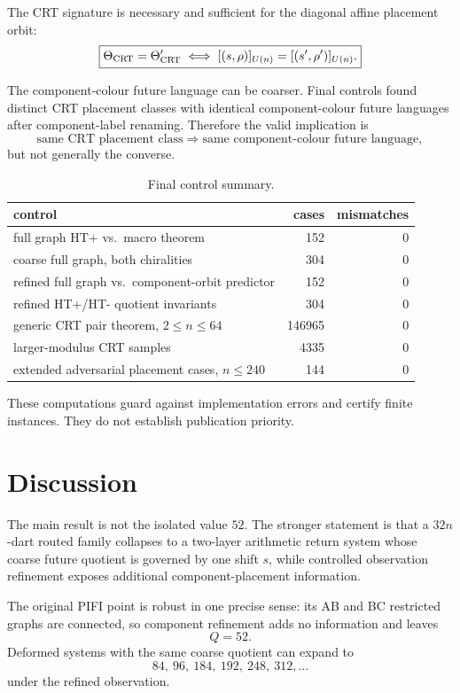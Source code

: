 \documentclass[11pt,a4paper]{article}
\theoremstyle{definition}
\begin{document}
The CRT signature is necessary and sufficient for the diagonal affine placement orbit:
\[
\boxed{
\Theta_{\rm CRT}=\Theta'_{\rm CRT}
\iff
[(s,\rho)]_{U(n)}
=
[(s',\rho')]_{U(n)}.
}
\]

The component-colour future language can be coarser.
Final controls found distinct CRT placement classes with identical component-colour future languages after component-label renaming.
Therefore the valid implication is
\[
\boxed{
\text{same CRT placement class}
\Longrightarrow
\text{same component-colour future language},
}
\]
but not generally the converse.

\begin{table}[h]
\centering
\caption{Final control summary.}
\begin{tabular}{lrr}
\toprule
control & cases & mismatches\\
\midrule
full graph HT+ vs.\ macro theorem & 152 & 0\\
coarse full graph, both chiralities & 304 & 0\\
refined full graph vs.\ component-orbit predictor & 152 & 0\\
refined HT+/HT- quotient invariants & 304 & 0\\
generic CRT pair theorem, \(2\le n\le64\) & 146965 & 0\\
larger-modulus CRT samples & 4335 & 0\\
extended adversarial placement cases, \(n\le240\) & 144 & 0\\
\bottomrule
\end{tabular}
\end{table}

These computations guard against implementation errors and certify finite instances.
They do not establish publication priority.

\section{Discussion}

The main result is not the isolated value \(52\).
The stronger statement is that a \(32n\)-dart routed family collapses to a two-layer arithmetic return system whose coarse future quotient is governed by one shift \(s\), while controlled observation refinement exposes additional component-placement information.

The original PIFI point is robust in one precise sense:
its AB and BC restricted graphs are connected, so component refinement adds no information and leaves
\[
Q=52.
\]
Deformed systems with the same coarse quotient can expand to
\[
84,\ 96,\ 184,\ 192,\ 248,\ 312,\ldots
\]
under the refined observation.
\end{document}
